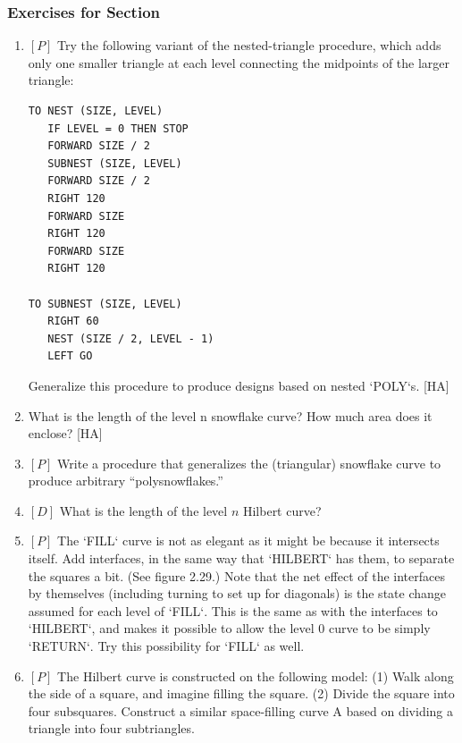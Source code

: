 \documentclass{book}
\begin{document}
\subsubsection{Exercises for Section \thesection}

\begin{enumerate}
\item $[P]$ Try the following variant of the nested-triangle procedure, which
adds only one smaller triangle at each level connecting the midpoints of
the larger triangle:

\begin{verbatim}
TO NEST (SIZE, LEVEL)
   IF LEVEL = 0 THEN STOP
   FORWARD SIZE / 2
   SUBNEST (SIZE, LEVEL)
   FORWARD SIZE / 2
   RIGHT 120
   FORWARD SIZE
   RIGHT 120
   FORWARD SIZE
   RIGHT 120

TO SUBNEST (SIZE, LEVEL)
   RIGHT 60
   NEST (SIZE / 2, LEVEL - 1)
   LEFT GO
\end{verbatim}
Generalize this procedure to produce designs based on nested \textsc{`POLY`}s.
[HA]
\item What is the length of the level n snowflake curve? How much area
does it enclose? [HA]
\item $[P]$ Write a procedure that generalizes the (triangular) snowflake curve
to produce arbitrary ``polysnowflakes.''
\item $[D]$ What is the length of the level $n$ Hilbert curve?  
\item $[P]$ The \textsc{`FILL`} curve is not as elegant as it might be because it intersects
itself. Add interfaces, in the same way that \textsc{`HILBERT`} has them, to
separate the squares a bit. (See figure 2.29.) Note that the net effect of
the interfaces by themselves (including turning to set up for diagonals)
is the state change assumed for each level of \textsc{`FILL`}. This is the same as
with the interfaces to \textsc{`HILBERT`}, and makes it possible to allow the level
0 curve to be simply \textsc{`RETURN`}. Try this possibility for \textsc{`FILL`} as well.
\item $[P]$ The Hilbert curve is constructed on the following model: (1) Walk
along the side of a square, and imagine filling the square. (2) Divide
the square into four subsquares. Construct a similar space-filling curve
A based on dividing a triangle into four subtriangles.


\end{enumerate}
\end{document}
